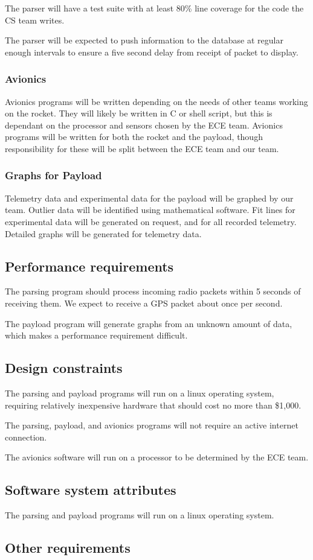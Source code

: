 \documentclass[onecolumn, draftclsnofoot, 10pt, compsoc]{IEEEtran}
\begin{document}
The parser will have a test suite with at least 80\% line coverage for the code the CS team writes.

The parser will be expected to push information to the database at regular enough intervals to ensure a five second delay from receipt of packet to display.

\subsubsection{Avionics}
Avionics programs will be written depending on the needs of other teams working on the rocket. They will likely be written in C or shell script, but this is dependant on the processor and sensors chosen by the ECE team. Avionics programs will be written for both the rocket and the payload, though responsibility for these will be split between the ECE team and our team.

\subsubsection{Graphs for Payload}
Telemetry data and experimental data for the payload will be graphed by our team. Outlier data will be identified using mathematical software. Fit lines for experimental data will be generated on request, and for all recorded telemetry. Detailed graphs will be generated for telemetry data.

\subsection{Performance requirements}
The parsing program should process incoming radio packets within 5 seconds of receiving them.  We expect to receive a GPS packet about once per second.

The payload program will generate graphs from an unknown amount of data, which makes a performance requirement difficult.

\subsection{Design constraints}
The parsing and payload programs will run on a linux operating system, requiring relatively inexpensive hardware that should cost no more than \$1,000.

The parsing, payload, and avionics programs will not require an active internet connection.

The avionics software will run on a processor to be determined by the ECE team.

\subsection{Software system attributes}
The parsing and payload programs will run on a linux operating system.

\subsection{Other requirements}
\end{document}
